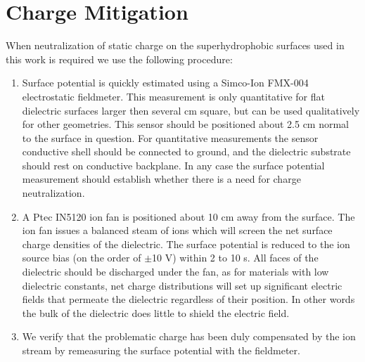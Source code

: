 \documentclass[12pt,a4paper,oneside]{book}
\begin{document}
\chapter{Charge Mitigation}
\label{sec.mitigation}
When neutralization of static charge on the superhydrophobic surfaces used in this work is required we use the following procedure:
\begin{enumerate}
\item Surface potential is quickly estimated using a Simco-Ion FMX-004 electrostatic fieldmeter. This measurement is only quantitative for flat dielectric surfaces larger then several cm square, but can be used qualitatively for other geometries. This sensor should be positioned about 2.5 cm normal to the surface in question. For quantitative measurements the sensor conductive shell should be connected to ground, and the dielectric substrate should rest on conductive backplane. In any case the surface potential measurement should establish whether there is a need for charge neutralization.
\item A Ptec IN5120 ion fan is positioned about 10 cm away from the surface. The ion fan issues a balanced steam of ions which will screen the net surface charge densities of the dielectric. The surface potential is reduced to the ion source bias (on the order of $\pm$10 V) within 2 to 10 s. All faces of the dielectric should be discharged under the fan, as for materials with low dielectric constants, net charge distributions will set up significant electric fields that permeate the dielectric regardless of their position. In other words the bulk of the dielectric does little to shield the electric field.
\item We verify that the problematic charge has been duly compensated by the ion stream by remeasuring the surface potential with the fieldmeter.
\end{enumerate}


\singlespacing
\backmatter
\printbibliography
\end{document}
